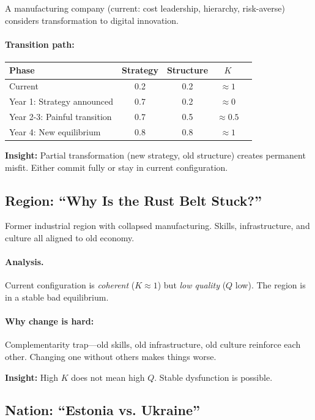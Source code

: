 \documentclass[12pt,a4paper]{article}
\begin{document}
A manufacturing company (current: cost leadership, hierarchy, risk-averse) 
considers transformation to digital innovation.

\paragraph{Transition path:}
\begin{center}
\small
\begin{tabular}{lcccc}
\hline
Phase & Strategy & Structure & $K$ \\
\hline
Current & 0.2 & 0.2 & $\approx 1$ \\
Year 1: Strategy announced & 0.7 & 0.2 & $\approx 0$ \\
Year 2-3: Painful transition & 0.7 & 0.5 & $\approx 0.5$ \\
Year 4: New equilibrium & 0.8 & 0.8 & $\approx 1$ \\
\hline
\end{tabular}
\end{center}

\textbf{Insight:} Partial transformation (new strategy, old structure) creates permanent misfit. 
Either commit fully or stay in current configuration.

\subsection{Region: ``Why Is the Rust Belt Stuck?''}

Former industrial region with collapsed manufacturing. 
Skills, infrastructure, and culture all aligned to old economy.

\paragraph{Analysis.}
Current configuration is \emph{coherent} ($K \approx 1$) but \emph{low quality} ($Q$ low).
The region is in a stable bad equilibrium.

\paragraph{Why change is hard:}
Complementarity trap---old skills, old infrastructure, old culture reinforce each other.
Changing one without others makes things worse.

\textbf{Insight:} High $K$ does not mean high $Q$. Stable dysfunction is possible.

\subsection{Nation: ``Estonia vs. Ukraine''}
\end{document}
